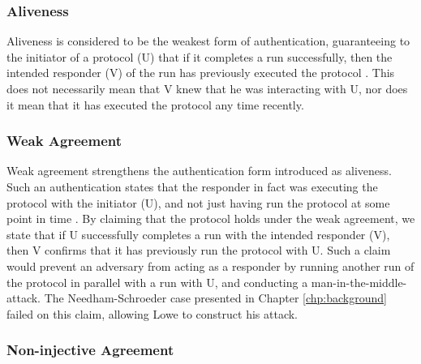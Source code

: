 


\subsubsection{Aliveness}

Aliveness is considered to be the weakest form of authentication, guaranteeing to the initiator of a protocol (U) that if it completes a run successfully, then the intended responder (V) of the run has previously executed the protocol \cite{lowe1997hierarchy}. This does not necessarily mean that V knew that he was interacting with U, nor does it mean that it has executed the protocol any time recently. 


\subsubsection{Weak Agreement}

Weak agreement strengthens the authentication form introduced as aliveness. Such an authentication states that the responder in fact was executing the protocol with the initiator (U), and not just having run the protocol at some point in time \cite{lowe1997hierarchy}. By claiming that the protocol holds under the weak agreement, we state that if U successfully completes a run with the intended responder (V), then V confirms that it has previously run the protocol with U. Such a claim would prevent an adversary from acting as a responder by running another run of the protocol in parallel with a run with U, and conducting a man-in-the-middle-attack. The Needham-Schroeder case presented in Chapter \ref{chp:background} failed on this claim, allowing Lowe to construct his attack. 


\subsubsection{Non-injective Agreement}

